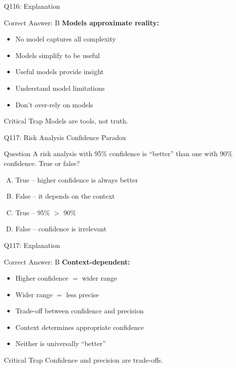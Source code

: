 \documentclass{beamer}
\begin{document}
	\begin{frame}{Q116: Explanation}
		\begin{block}{Correct Answer: B}
			\textbf{Models approximate reality:}
			\begin{itemize}
				\item No model captures all complexity
				\item Models simplify to be useful
				\item Useful models provide insight
				\item Understand model limitations
				\item Don't over-rely on models
			\end{itemize}
		\end{block}
		\begin{alertblock}{Critical Trap}
			Models are tools, not truth.
		\end{alertblock}
	\end{frame}
	
	\begin{frame}{Q117: Risk Analysis Confidence Paradox}
		\begin{block}{Question}
			A risk analysis with 95\% confidence is ``better'' than one with 90\% confidence. True or false?
		\end{block}
		\begin{enumerate}[(A)]
			\item True -- higher confidence is always better
			\item False -- it depends on the context
			\item True -- 95\% $>$ 90\%
			\item False -- confidence is irrelevant
		\end{enumerate}
	\end{frame}
	
	\begin{frame}{Q117: Explanation}
		\begin{block}{Correct Answer: B}
			\textbf{Context-dependent:}
			\begin{itemize}
				\item Higher confidence $=$ wider range
				\item Wider range $=$ less precise
				\item Trade-off between confidence and precision
				\item Context determines appropriate confidence
				\item Neither is universally ``better''
			\end{itemize}
		\end{block}
		\begin{alertblock}{Critical Trap}
			Confidence and precision are trade-offs.
		\end{alertblock}
	\end{frame}
	
\end{document}
